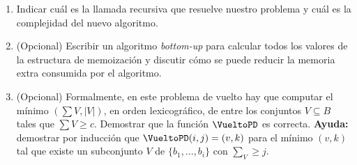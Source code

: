 \begin{enumerate}[label=$\alph*)$,ref=$\alph*)$]
 \item Indicar cuál es la llamada recursiva que resuelve nuestro problema y cuál es la complejidad del nuevo algoritmo.

 \item (Opcional) Escribir un algoritmo \emph{bottom-up} para calcular todos los valores de la estructura de memoización y discutir cómo se puede reducir la memoria extra consumida por el algoritmo.

 \item (Opcional) Formalmente, en este problema de vuelto hay que computar el mínimo $(\sum V, |V|)$, en orden lexicográfico, de entre los conjuntos $V \subseteq B$ tales que $\sum V \geq c$.  Demostrar que la función $\VueltoPD$ es correcta.  \textbf{Ayuda:} demostrar por inducción que $\VueltoPD(i,j) = (v,k)$ para el mínimo $(v,k)$ tal que existe un subconjunto $V$ de $\{b_1, \ldots, b_i\}$ con $\sum_V \geq j$.

\end{enumerate}

